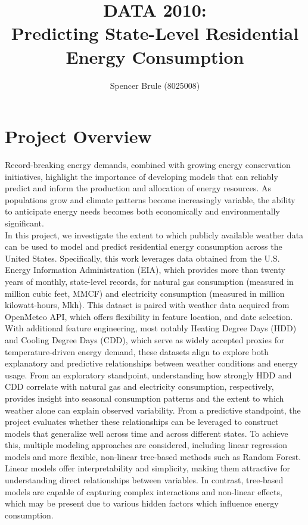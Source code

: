 \documentclass[11pt,a4paper]{article}
\title{\textbf{DATA 2010:\\ Predicting State-Level Residential Energy Consumption}\\
\large \termname}
\author{
Spencer Brule (8025008) \\
}
\date{}
\begin{document}
\maketitle
\section{Project Overview}
Record-breaking energy demands, combined with growing energy conservation initiatives, highlight the importance of developing models that can reliably predict and inform the production and allocation of energy resources. As populations grow and climate patterns become increasingly variable, the ability to anticipate energy needs becomes both economically and environmentally significant.\\
In this project, we investigate the extent to which publicly available weather data can be used to model and predict residential energy consumption across the United States.
Specifically, this work leverages data obtained from the U.S. Energy Information Administration (EIA), which provides more than twenty years of monthly, state-level records, for natural gas consumption (measured in million cubic feet, MMCF) and electricity consumption (measured in million kilowatt-hours, Mkh). This dataset is paired with weather data acquired from OpenMeteo API, which offers flexibility in feature location, and date selection. With additional feature engineering, most notably Heating Degree Days (HDD) and Cooling Degree Days (CDD), which serve as widely accepted proxies for temperature-driven energy demand, these datasets align to explore both explanatory and predictive relationships between weather conditions and energy usage. From an exploratory standpoint, understanding how strongly HDD and CDD correlate with natural gas and electricity consumption, respectively, provides insight into seasonal consumption patterns and the extent to which weather alone can explain observed variability. From a predictive standpoint, the project evaluates whether these relationships can be leveraged to construct models that generalize well across time and across different states.
To achieve this, multiple modeling approaches are considered, including linear regression models and more flexible, non-linear tree-based methods such as Random Forest. Linear models offer interpretability and simplicity, making them attractive for understanding direct relationships between variables. In contrast, tree-based models are capable of capturing complex interactions and non-linear effects, which may be present due to various hidden factors which influence energy consumption. 
\end{document}
